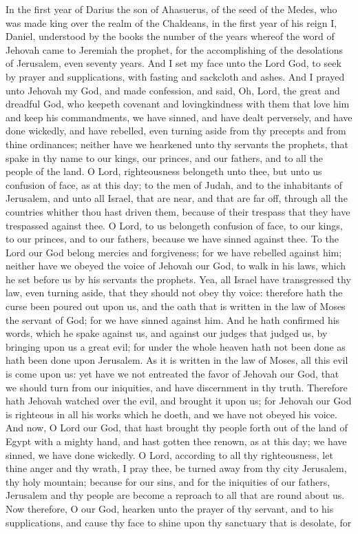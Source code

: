 In the first year of Darius the son of Ahasuerus, of the seed of the Medes, who was made king over the realm of the Chaldeans, in the first year of his reign I, Daniel, understood by the books the number of the years whereof the word of Jehovah came to Jeremiah the prophet, for the accomplishing of the desolations of Jerusalem, even seventy years.  And I set my face unto the Lord God, to seek by prayer and supplications, with fasting and sackcloth and ashes. And I prayed unto Jehovah my God, and made confession, and said, Oh, Lord, the great and dreadful God, who keepeth covenant and lovingkindness with them that love him and keep his commandments, we have sinned, and have dealt perversely, and have done wickedly, and have rebelled, even turning aside from thy precepts and from thine ordinances; neither have we hearkened unto thy servants the prophets, that spake in thy name to our kings, our princes, and our fathers, and to all the people of the land. O Lord, righteousness belongeth unto thee, but unto us confusion of face, as at this day; to the men of Judah, and to the inhabitants of Jerusalem, and unto all Israel, that are near, and that are far off, through all the countries whither thou hast driven them, because of their trespass that they have trespassed against thee. O Lord, to us belongeth confusion of face, to our kings, to our princes, and to our fathers, because we have sinned against thee. To the Lord our God belong mercies and forgiveness; for we have rebelled against him; neither have we obeyed the voice of Jehovah our God, to walk in his laws, which he set before us by his servants the prophets. Yea, all Israel have transgressed thy law, even turning aside, that they should not obey thy voice: therefore hath the curse been poured out upon us, and the oath that is written in the law of Moses the servant of God; for we have sinned against him. And he hath confirmed his words, which he spake against us, and against our judges that judged us, by bringing upon us a great evil; for under the whole heaven hath not been done as hath been done upon Jerusalem. As it is written in the law of Moses, all this evil is come upon us: yet have we not entreated the favor of Jehovah our God, that we should turn from our iniquities, and have discernment in thy truth. Therefore hath Jehovah watched over the evil, and brought it upon us; for Jehovah our God is righteous in all his works which he doeth, and we have not obeyed his voice. And now, O Lord our God, that hast brought thy people forth out of the land of Egypt with a mighty hand, and hast gotten thee renown, as at this day; we have sinned, we have done wickedly. O Lord, according to all thy righteousness, let thine anger and thy wrath, I pray thee, be turned away from thy city Jerusalem, thy holy mountain; because for our sins, and for the iniquities of our fathers, Jerusalem and thy people are become a reproach to all that are round about us. Now therefore, O our God, hearken unto the prayer of thy servant, and to his supplications, and cause thy face to shine upon thy sanctuary that is desolate, for 
